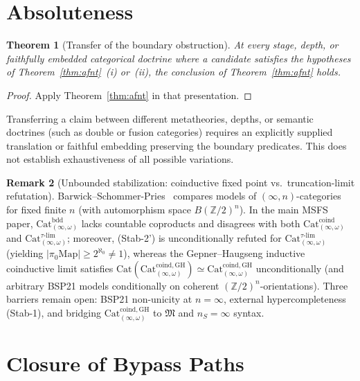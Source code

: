 \documentclass[11pt]{article}
\theoremstyle{plain}
\newtheorem{theorem}{Theorem}[section]
\theoremstyle{definition}
\newtheorem{remark}[theorem]{Remark}
\newcommand{\fM}{\mathfrak{M}}
\newcommand{\Cat}{\mathrm{Cat}}
\begin{document}
\section{Absoluteness}\label{sec:absolute}

\begin{theorem}[Transfer of the boundary obstruction]\label{thm:absolute}
At every stage, depth, or faithfully embedded categorical doctrine where a candidate satisfies the hypotheses of Theorem~\ref{thm:afnt}~(i) or~(ii), the conclusion of Theorem~\ref{thm:afnt} holds.
\end{theorem}
\begin{proof}
Apply Theorem~\ref{thm:afnt} in that presentation.
\end{proof}
Transferring a claim between different metatheories, depths, or semantic doctrines (such as double or fusion categories) requires an explicitly supplied translation or faithful embedding preserving the boundary predicates. This does not establish exhaustiveness of all possible variations.

\begin{remark}[Unbounded stabilization: coinductive fixed point vs.\ truncation-limit refutation]\label{thm:stab}
Barwick--Schommer-Pries~\cite{BarwickSchommerPries2021} compares models of $(\infty,n)$-categories for fixed finite $n$ (with automorphism space $B(\mathbb{Z}/2)^n$). In the main MSFS paper, $\Cat_{(\infty,\omega)}^{\mathrm{bdd}}$ lacks countable coproducts and disagrees with both $\Cat_{(\infty,\omega)}^{\mathrm{coind}}$ and $\Cat_{(\infty,\omega)}^{\tau\text{-}\mathrm{lim}}$; moreover, \textup{(Stab-2')} is unconditionally refuted for $\Cat_{(\infty,\omega)}^{\tau\text{-}\mathrm{lim}}$ (yielding $|\pi_0\mathrm{Map}| \ge 2^{\aleph_0} \neq 1$), whereas the Gepner--Haugseng inductive coinductive limit satisfies $\Cat(\Cat_{(\infty,\omega)}^{\mathrm{coind, GH}}) \simeq \Cat_{(\infty,\omega)}^{\mathrm{coind, GH}}$ unconditionally (and arbitrary BSP21 models conditionally on coherent $(\mathbb{Z}/2)^n$-orientations). Three barriers remain open: BSP21 non-unicity at $n = \infty$, external hypercompleteness \textup{(Stab-1)}, and bridging $\Cat_{(\infty,\omega)}^{\mathrm{coind, GH}}$ to $\fM$ and $n_S = \infty$ syntax.
\end{remark}

\section{Closure of Bypass Paths}\label{sec:bypass}
\end{document}
